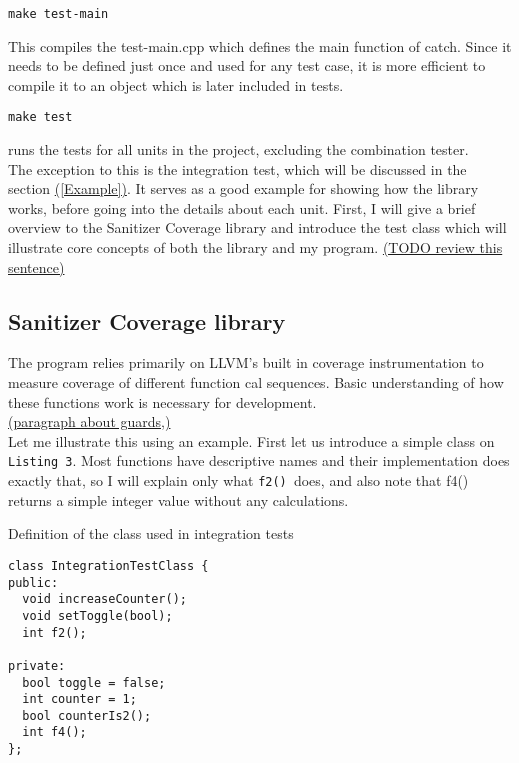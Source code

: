 \documentclass{elteikthesis}[2018/06/06]
\begin{document}
\begin{verbatim}
make test-main
\end{verbatim}
This compiles the test-main.cpp which defines the main function of catch. Since it needs to be defined just once and used for any test case, it is more efficient to compile it to an object which is later included in tests. \\
\begin{verbatim}
make test
\end{verbatim}
runs the tests for all units in the project, excluding the combination tester. \\

The exception to this is the integration test, which will be discussed in the section \uline{([Example])}. It serves as a good example for showing how the library works, before going into the details about each unit. First, I will give a brief overview to the Sanitizer Coverage library and introduce the test class which will illustrate core concepts of both the library and my program. \uline{(TODO review this sentence)} \\

\subsection{Sanitizer Coverage library}
\label{sec-3-2-2}
The program relies primarily on LLVM's built in coverage instrumentation to measure coverage of different function cal sequences. Basic understanding of how these functions work is necessary for development. \\

\uline{(paragraph about guards,)} \\


Let me illustrate this using an example. First let us introduce a simple class on \texttt{Listing 3}. Most functions have descriptive names and their implementation does exactly that, so I will explain only what \texttt{f2() }does, and also note that f4() returns a simple integer value without any calculations. \\
\begin{listing}
\caption{Definition of the class used in integration tests}
\begin{verbatim}
class IntegrationTestClass {
public:
  void increaseCounter();
  void setToggle(bool);
  int f2();

private:
  bool toggle = false;
  int counter = 1;
  bool counterIs2();
  int f4();
};
\end{verbatim}
\end{listing}
\end{document}

